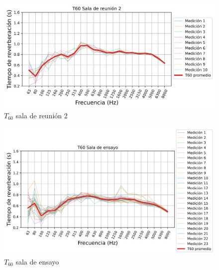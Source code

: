 \begin{figure}[H]
    \centering
    \includegraphics[width=12cm]{Imagenes/Resultados/T60_Sala_reunion_2.png}
    \caption{$T_{60}$ sala de reunión 2}
    \label{fig: T60 sala2}
\end{figure}

\begin{figure}[H]
    \centering
    \includegraphics[width=12cm]{Imagenes/Resultados/T60_Sala_de_ensayo.png}
    \caption{$T_{60}$ sala de ensayo}
    \label{fig: T60 sala de ensayo}
\end{figure}

